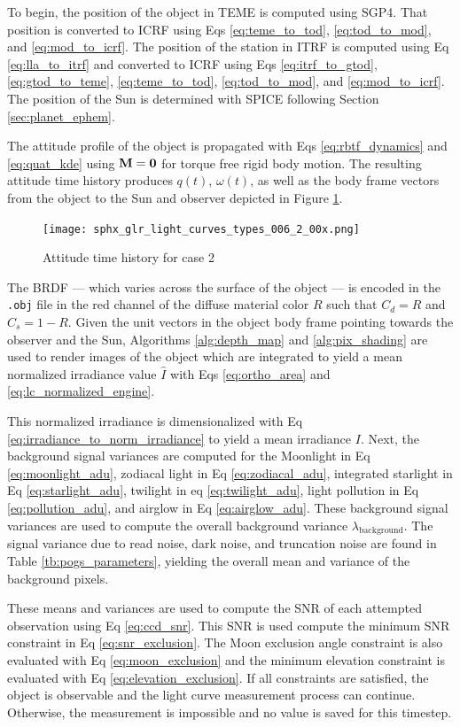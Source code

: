 To begin, the position of the object in TEME is computed using SGP4. That position is converted to ICRF using Eqs \ref{eq:teme_to_tod}, \ref{eq:tod_to_mod}, and \ref{eq:mod_to_icrf}. The position of the station in ITRF is computed using Eq \ref{eq:lla_to_itrf} and converted to ICRF using Eqs \ref{eq:itrf_to_gtod}, \ref{eq:gtod_to_teme}, \ref{eq:teme_to_tod}, \ref{eq:tod_to_mod}, and \ref{eq:mod_to_icrf}. The position of the Sun is determined with SPICE following Section \ref{sec:planet_ephem}. 

The attitude profile of the object is propagated with Eqs \ref{eq:rbtf_dynamics} and \ref{eq:quat_kde} using $\mathbf{M}=\mathbf{0}$ for torque free rigid body motion. The resulting attitude time history produces $q(t)$, $\omega(t)$, as well as the body frame vectors from the object to the Sun and observer depicted in Figure \ref{fig:case2_attitude}.

\begin{figure}[!htb]
  \centering
  \texttt{[image: sphx\_glr\_light\_curves\_types\_006\_2\_00x.png]}
  \caption{Attitude time history for case 2}
  \label{fig:case2_attitude}
\end{figure}

The BRDF --- which varies across the surface of the object --- is encoded in the \texttt{.obj} file in the red channel of the diffuse material color $R$ such that $C_d = R$ and $C_s = 1 - R$. Given the unit vectors in the object body frame pointing towards the observer and the Sun, Algorithms \ref{alg:depth_map} and \ref{alg:pix_shading} are used to render images of the object which are integrated to yield a mean normalized irradiance value $\hat{I}$ with Eqs \ref{eq:ortho_area} and \ref{eq:lc_normalized_engine}. 

This normalized irradiance is dimensionalized with Eq \ref{eq:irradiance_to_norm_irradiance} to yield a mean irradiance $I$. Next, the background signal variances are computed for the Moonlight in Eq \ref{eq:moonlight_adu}, zodiacal light in Eq \ref{eq:zodiacal_adu}, integrated starlight in Eq \ref{eq:starlight_adu}, twilight in eq \ref{eq:twilight_adu}, light pollution in Eq \ref{eq:pollution_adu}, and airglow in Eq \ref{eq:airglow_adu}. These background signal variances are used to compute the overall background variance $\lambda_\mathrm{background}$. The signal variance due to read noise, dark noise, and truncation noise are found in Table \ref{tb:pogs_parameters}, yielding the overall mean and variance of the background pixels. 

These means and variances are used to compute the SNR of each attempted observation using Eq \ref{eq:ccd_snr}. This SNR is used compute the minimum SNR constraint in Eq \ref{eq:snr_exclusion}. The Moon exclusion angle constraint is also evaluated with Eq \ref{eq:moon_exclusion} and the minimum elevation constraint is evaluated with Eq \ref{eq:elevation_exclusion}. If all constraints are satisfied, the object is observable and the light curve measurement process can continue. Otherwise, the measurement is impossible and no value is saved for this timestep.

